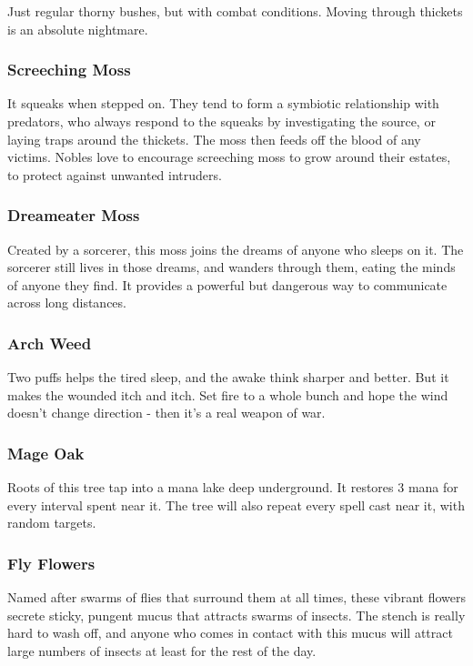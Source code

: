 \begin{multicols}{2}
Just regular thorny bushes, but with combat conditions.
Moving through thickets is an absolute nightmare.

\subsubsection{Screeching Moss}
\label{screeching_moss}

It squeaks when stepped on.
They tend to form a symbiotic relationship with predators, who always respond to the squeaks by investigating the source, or laying traps around the thickets.
The moss then feeds off the blood of any victims.
Nobles love to encourage screeching moss to grow around their estates, to protect against unwanted intruders.

\subsubsection{Dreameater Moss}
\label{dreameater_moss}

Created by a sorcerer, this moss joins the dreams of anyone who sleeps on it.
The sorcerer still lives in those dreams, and wanders through them, eating the minds of anyone they find.
It provides a powerful but dangerous way to communicate across long distances.

\subsubsection{Arch Weed}
\label{arch_weed}

Two puffs helps the tired sleep, and the awake think sharper and better.
But it makes the wounded itch and itch.
Set fire to a whole bunch and hope the wind doesn't change direction - then it's a real weapon of war.

\subsubsection{Mage Oak}
\label{mage_oak}

Roots of this tree tap into a mana lake deep underground. It restores 3 mana for every interval spent near it.
The tree will also repeat every spell cast near it, with random targets.

\subsubsection{Fly Flowers}
\label{fly_flowers}

Named after swarms of flies that surround them at all times, these vibrant flowers secrete sticky, pungent mucus that attracts swarms 
of insects. The stench is really hard to wash off, and anyone who comes in contact with this mucus will attract large numbers of 
insects at least for the rest of the day.


\end{multicols}
